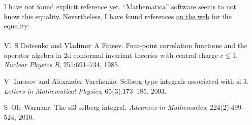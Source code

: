 \documentclass{article}
\newcommand{\tmtextit}[1]{{\itshape{#1}}}
\begin{document}
I have not found explicit reference yet. ``Mathematica'' software seems to not
know this equality. Nevertheless, I have found references
\href{http://functions.wolfram.com/Polynomials/HermiteH/21/02/01/0008/}{on the
web} for the equality:
\begin{eqnarray}
  &  &  \nonumber
\end{eqnarray}
\begin{thebibliography}{War10}
  Vl~S Dotsenko and Vladimir~A Fateev.
  {\newblock}Four-point correlation functions and the operator algebra in 2d
  conformal invariant theories with central charge $c \leq 1$.
  {\newblock}\tmtextit{Nuclear Physics B}, 251:691--734, 1985.
  
  V~Tarasov and Alexander Varchenko.
  {\newblock}Selberg-type integrals associated with sl 3.
  {\newblock}\tmtextit{Letters in Mathematical Physics}, 65(3):173--185, 2003.
  
  S~Ole Warnaar. {\newblock}The sl3 selberg
  integral. {\newblock}\tmtextit{Advances in Mathematics}, 224(2):499--524,
  2010.
\end{thebibliography}
\end{document}
